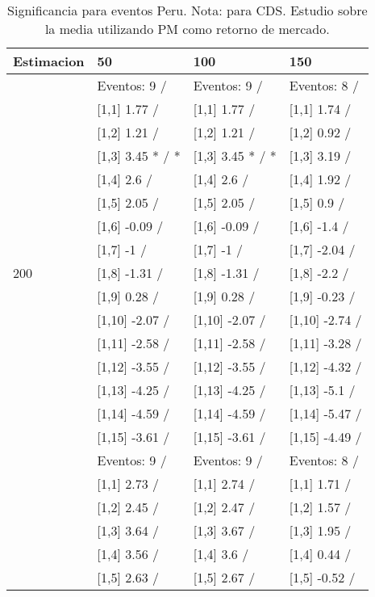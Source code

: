\begin{table}

\caption{Significancia para eventos Peru. Nota: para CDS. Estudio sobre la media utilizando PM como retorno de mercado.}
\centering
\begin{tabular}[t]{llll}
\toprule
Estimacion & 50 & 100 & 150\\
\midrule
 & Eventos:  9 / & Eventos:  9 / & Eventos:  8 /\\
 & {}[1,1] 1.77  / & {}[1,1] 1.77  / & {}[1,1] 1.74  /\\
 & {}[1,2] 1.21  / & {}[1,2] 1.21  / & {}[1,2] 0.92  /\\
 & {}[1,3] 3.45 * / * & {}[1,3] 3.45 * / * & {}[1,3] 3.19  /\\
 & {}[1,4] 2.6  / & {}[1,4] 2.6  / & {}[1,4] 1.92  /\\
\addlinespace
 & {}[1,5] 2.05  / & {}[1,5] 2.05  / & {}[1,5] 0.9  /\\
 & {}[1,6] -0.09  / & {}[1,6] -0.09  / & {}[1,6] -1.4  /\\
 & {}[1,7] -1  / & {}[1,7] -1  / & {}[1,7] -2.04  /\\
200 & {}[1,8] -1.31  / & {}[1,8] -1.31  / & {}[1,8] -2.2  /\\
 & {}[1,9] 0.28  / & {}[1,9] 0.28  / & {}[1,9] -0.23  /\\
\addlinespace
 & {}[1,10] -2.07  / & {}[1,10] -2.07  / & {}[1,10] -2.74  /\\
 & {}[1,11] -2.58  / & {}[1,11] -2.58  / & {}[1,11] -3.28  /\\
 & {}[1,12] -3.55  / & {}[1,12] -3.55  / & {}[1,12] -4.32  /\\
 & {}[1,13] -4.25  / & {}[1,13] -4.25  / & {}[1,13] -5.1  /\\
 & {}[1,14] -4.59  / & {}[1,14] -4.59  / & {}[1,14] -5.47  /\\
\addlinespace
 & {}[1,15] -3.61  / & {}[1,15] -3.61  / & {}[1,15] -4.49  /\\
 & Eventos:  9 / & Eventos:  9 / & Eventos:  8 /\\
 & {}[1,1] 2.73  / & {}[1,1] 2.74  / & {}[1,1] 1.71  /\\
 & {}[1,2] 2.45  / & {}[1,2] 2.47  / & {}[1,2] 1.57  /\\
 & {}[1,3] 3.64  / & {}[1,3] 3.67  / & {}[1,3] 1.95  /\\
\addlinespace
 & {}[1,4] 3.56  / & {}[1,4] 3.6  / & {}[1,4] 0.44  /\\
 & {}[1,5] 2.63  / & {}[1,5] 2.67  / & {}[1,5] -0.52  /\\

\end{tabular}
\end{table}
